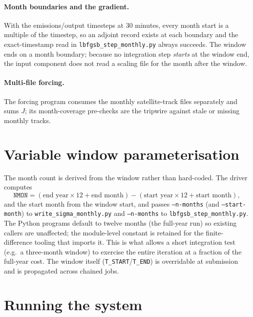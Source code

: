 \documentclass[11pt]{article}
\newcommand{\code}[1]{\texttt{#1}}
\begin{document}
\paragraph{Month boundaries and the gradient.} With the emissions/output timesteps
at $30$ minutes, every month start is a multiple of the timestep, so an adjoint
record exists at each boundary and the exact-timestamp read in
\code{lbfgsb\_step\_monthly.py} always succeeds. The window ends on a month
boundary; because no integration step \emph{starts} at the window end, the input
component does not read a scaling file for the month after the window.

\paragraph{Multi-file forcing.} The forcing program consumes the monthly
satellite-track files separately and sums $J$; its month-coverage pre-checks are
the tripwire against stale or missing monthly tracks.

\section{Variable window parameterisation}

The month count is derived from the window rather than hard-coded. The driver
computes
\[
  \code{NMON} = (\text{end year}\times 12 + \text{end month})
              - (\text{start year}\times 12 + \text{start month}),
\]
and the start month from the window start, and passes \code{--n-months} (and
\code{--start-month}) to \code{write\_sigma\_monthly.py} and \code{--n-months} to
\code{lbfgsb\_step\_monthly.py}. The Python programs default to twelve months (the
full-year run) so existing callers are unaffected; the module-level constant is
retained for the finite-difference tooling that imports it. This is what allows a
short integration test (e.g.\ a three-month window) to exercise the entire
iteration at a fraction of the full-year cost. The window itself
(\code{T\_START}/\code{T\_END}) is overridable at submission and is propagated
across chained jobs.

\section{Running the system}
\label{sec:running}
\end{document}
